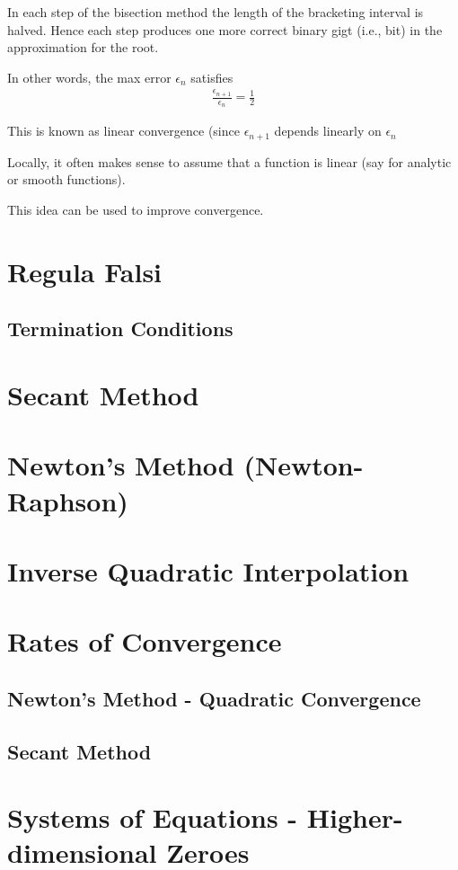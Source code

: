    In each step of the bisection method the length of the bracketing interval is halved. 
    Hence each step produces one more correct binary gigt (i.e., bit) in the approximation for the root.
    
    In other words, the max error $\epsilon_n$ satisfies
    \begin{align}
        \frac{\epsilon_{n+1}}{\epsilon_n} = \frac{1}{2}
    \end{align}
    
    This is known as linear convergence (since $\epsilon_{n+1}$ depends linearly on $\epsilon_n$
    
    Locally, it often makes sense to assume that a function is linear (say for analytic or smooth functions).
    
    This idea can be used to improve convergence.
    
    \section{Regula Falsi}
    \begin{figure}
      \centering
      
    \end{figure}
    \begin{figure}
      \centering
      
    \end{figure}
    \begin{figure}
      \centering
      
    \end{figure}
    
    \subsection{Termination Conditions}
    
    \section{Secant Method}
    
    \section{Newton's Method (Newton-Raphson)}
    
    \section{Inverse Quadratic Interpolation}
    
    \section{Rates of Convergence}
    
    \subsection{Newton's Method - Quadratic Convergence}
    
    \subsection{Secant Method}
    
    \section{Systems of Equations - Higher-dimensional Zeroes}
